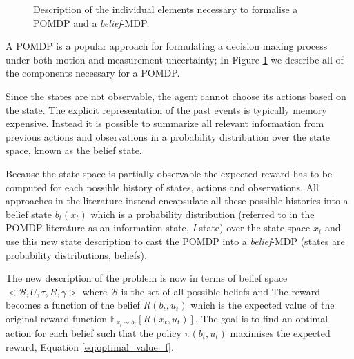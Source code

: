 \begin{figure}[h]
%
\caption{Description of the individual elements necessary to formalise a POMDP and a \textit{belief}-MDP.}
\label{fig:pomdp_tik}
\end{figure}




A POMDP is a popular approach for formulating a decision making process under both motion and measurement uncertainty;
In Figure \ref{fig:pomdp_tik} we describe all of the components necessary for a POMDP.

Since the states are not observable, the agent cannot choose its actions based on the state. The explicit 
representation of the past events is typically memory expensive. Instead it is possible to summarize all relevant 
information from previous actions and observations in a probability distribution over the state space, known as the
belief state. 

Because the state space is partially observable the expected reward has to be computed for each possible history of states, actions and observations.
All approaches in the literature instead encapsulate all these possible histories into a belief state $b_t(x_t)$ which is a 
probability distribution (referred to in the POMDP literature as an information state, \textit{I}-state) over the state space $x_t$ and use this 
new state description to cast the POMDP into a \textit{belief}-MDP (states are probability distributions, beliefs). 

The new description of the problem is now in terms of belief space $<\mathcal{B},U,\tau,R,\gamma>$ where $\mathcal{B}$ is the set of 
all possible beliefs and 
The reward becomes a function of the belief $R(b_t,u_t)$ which is the expected value of the original reward 
function $\mathbb{E}_{x_t \sim b_t}[R(x_t,u_t)]$, The goal is to find an optimal action for each belief such that 
the policy $\pi(b_t,u_t)$ maximises the expected reward, Equation \ref{eq:optimal_value_f}.

